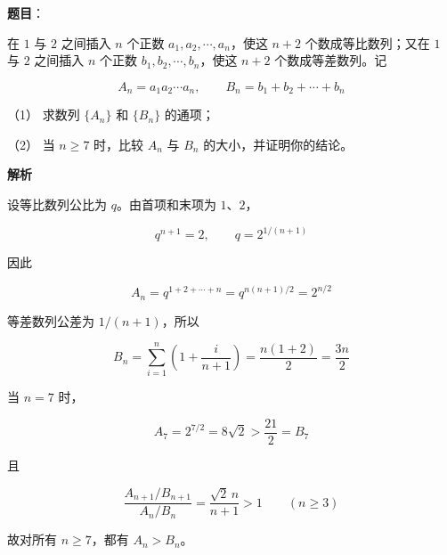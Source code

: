 \begin{answer}

\textbf{题目}：

在 $1$ 与 $2$ 之间插入 $n$ 个正数 $a_1,a_2,\cdots,a_n$，使这 $n+2$ 个数成等比数列；又在 $1$ 与 $2$ 之间插入 $n$ 个正数 $b_1,b_2,\cdots,b_n$，使这 $n+2$ 个数成等差数列。记

\nopagebreak[4]
\[
A_n=a_1a_2\cdots a_n,\qquad B_n=b_1+b_2+\cdots+b_n
\]

（1） 求数列 $\{A_n\}$ 和 $\{B_n\}$ 的通项；

（2） 当 $n\ge7$ 时，比较 $A_n$ 与 $B_n$ 的大小，并证明你的结论。

\textbf{解析}


设等比数列公比为 $q$。由首项和末项为 $1\text{、}2$，

\nopagebreak[4]
\[
q^{n+1}=2,\qquad q=2^{1/(n+1)}
\]

因此

\nopagebreak[4]
\[
A_n=q^{1+2+\cdots+n}
=q^{n(n+1)/2}
=2^{n/2}
\]

等差数列公差为 $1/(n+1)$，所以

\nopagebreak[4]
\[
B_n=\sum_{i=1}^n\left(1+\frac{i}{n+1}\right)
=\frac{n(1+2)}2
=\frac{3n}{2}
\]


当 $n=7$ 时，

\nopagebreak[4]
\[
A_7=2^{7/2}=8\sqrt2>\frac{21}{2}=B_7
\]

且

\nopagebreak[4]
\[
\frac{A_{n+1}/B_{n+1}}{A_n/B_n}
=\frac{\sqrt2\,n}{n+1}>1\qquad(n\ge3)
\]

故对所有 $n\ge7$，都有 $A_n>B_n$。



\end{answer}
